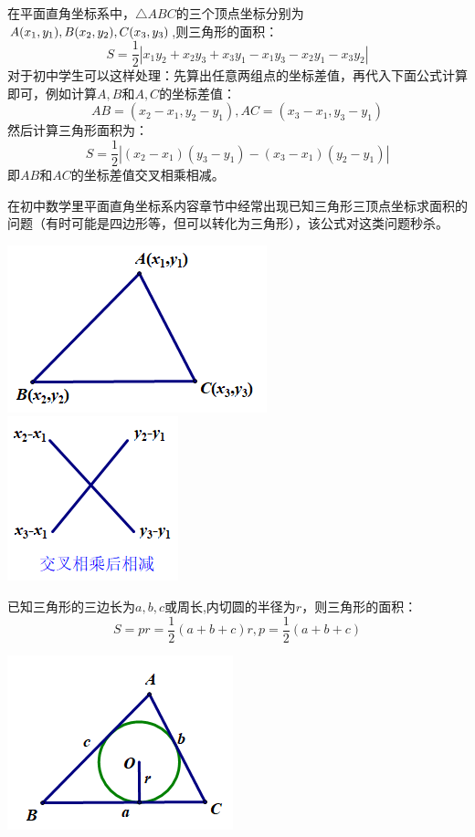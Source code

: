 \documentclass[10pt]{ctexart}
\begin{document}
\begin{minipage}[t]{0.7\textwidth}
\begin{dkli}{}{}
在平面直角坐标系中，$\triangle ABC$的三个顶点坐标分别为$A(x_1,y_1),\\B(x_2,y_2),C(x_3,y_3)$,则三角形的面积：
\[S=\dfrac{1}{2}\left|x_1y_2+x_2y_3+x_3y_1-x_1y_3-x_2y_1-x_3y_2\right|\]
对于初中学生可以这样处理：先算出任意两组点的坐标差值，再代入下面公式计算即可，例如计算$A,B$和$A,C$的坐标差值：
\[AB=(x_2-x_1,y_2-y_1),AC=(x_3-x_1,y_3-y_1)\]
然后计算三角形面积为：
\[S=\dfrac{1}{2}\left|(x_2-x_1)(y_3-y_1)-(x_3-x_1)(y_2-y_1)\right|\]即$AB$和$AC$的坐标差值交叉相乘相减。

在初中数学里平面直角坐标系内容章节中经常出现已知三角形三顶点坐标求面积的问题（有时可能是四边形等，但可以转化为三角形），该公式对这类问题秒杀。
\end{dkli}
\end{minipage}
\begin{minipage}[b]{0.3\textwidth}
\includegraphics[scale=0.6]{figure/mj-04.png}\\
\includegraphics[scale=0.6]{figure/mj-shizi.png}
\end{minipage}

\begin{minipage}[t]{0.7\textwidth}
\begin{dkli}{}{}
已知三角形的三边长为$a,b,c$或周长,内切圆的半径为$r$，则三角形的面积：
\[S=pr=\dfrac{1}{2}(a+b+c)r,p=\dfrac{1}{2}(a+b+c)\]
\end{dkli}
\end{minipage}
\begin{minipage}[t]{0.3\textwidth}
\includegraphics[scale=0.6]{figure/mj-05.png}
\end{minipage}
\end{document}
